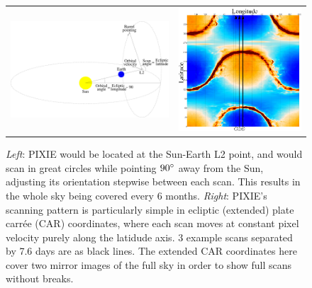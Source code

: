 \documentclass{article}
\begin{document}
\begin{figure}
	\centering
	\begin{tabular}{m{90mm}m{70mm}}
		\includegraphics[width=90mm]{plots/scan_orbit.pdf} &
		\includegraphics[width=70mm]{plots/scan_car.pdf}
	\end{tabular}
	\caption{\emph{Left}: PIXIE would be located at the Sun-Earth L2 point,
	and would scan in great circles while pointing $90\degree$ away from the
	Sun, adjusting its orientation stepwise between each scan. This results
	in the whole sky being covered every 6 months. \emph{Right}: PIXIE's
	scanning pattern is particularly simple in ecliptic (extended) plate carrée (CAR)
	coordinates, where each scan moves at constant pixel velocity purely along the
	latidude axis. 3 example scans separated by 7.6 days are as black lines.
	The extended CAR coordinates here cover two mirror images of the full sky
	in order to show full scans without breaks.}
\end{figure}
\end{document}

